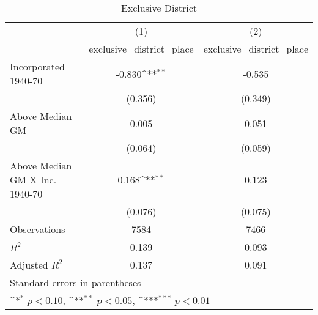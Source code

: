 \begin{table}[htbp]\centering
\def\sym#1{\ifmmode^{#1}\else\(^{#1}\)\fi}
\caption{Exclusive District}
\begin{tabular}{l*{2}{c}}
\hline\hline
                    &\multicolumn{1}{c}{(1)}&\multicolumn{1}{c}{(2)}\\
                    &\multicolumn{1}{c}{exclusive\_district\_place}&\multicolumn{1}{c}{exclusive\_district\_place}\\
\hline
Incorporated 1940-70&      -0.830\sym{**} &      -0.535         \\
                    &     (0.356)         &     (0.349)         \\
[1em]
Above Median GM     &       0.005         &       0.051         \\
                    &     (0.064)         &     (0.059)         \\
[1em]
Above Median GM X Inc. 1940-70&       0.168\sym{**} &       0.123         \\
                    &     (0.076)         &     (0.075)         \\
\hline
Observations        &        7584         &        7466         \\
\(R^{2}\)           &       0.139         &       0.093         \\
Adjusted \(R^{2}\)  &       0.137         &       0.091         \\
\hline\hline
\multicolumn{3}{l}{\footnotesize Standard errors in parentheses}\\
\multicolumn{3}{l}{\footnotesize \sym{*} \(p<0.10\), \sym{**} \(p<0.05\), \sym{***} \(p<0.01\)}\\
\end{tabular}
\end{table}
